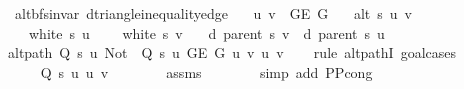 \begin{isabellebody}
\isamarkupfalse%
\ {\isacharparenleft}{\kern0pt}\ alt{\isacharunderscore}{\kern0pt}bfs{\isacharunderscore}{\kern0pt}invar{\isacharparenright}{\kern0pt}\ d{\isacharunderscore}{\kern0pt}triangle{\isacharunderscore}{\kern0pt}inequality{\isacharunderscore}{\kern0pt}edge{\isacharcolon}{\kern0pt}\isanewline
\ \ \ {\isachardoublequoteopen}{\isacharbraceleft}{\kern0pt}u{\isacharcomma}{\kern0pt}\ v{\isacharbraceright}{\kern0pt}\ {\isasymin}\ G{\isachardot}{\kern0pt}E\ G{\isachardoublequoteclose}\isanewline
\ \ \ {\isachardoublequoteopen}alt\ s\ u\ v{\isachardoublequoteclose}\isanewline
\ \ \ {\isachardoublequoteopen}{\isasymnot}\ white\ s\ u{\isachardoublequoteclose}\isanewline
\ \ \ {\isachardoublequoteopen}{\isasymnot}\ white\ s\ v{\isachardoublequoteclose}\isanewline
\ \ \ {\isachardoublequoteopen}d\ {\isacharparenleft}{\kern0pt}parent\ s{\isacharparenright}{\kern0pt}\ v\ {\isasymle}\ d\ {\isacharparenleft}{\kern0pt}parent\ s{\isacharparenright}{\kern0pt}\ u\ {\isacharplus}{\kern0pt}\ {}{\isachardoublequoteclose}\isanewline
%
\isadelimproof
%
\endisadelimproof
%
\isatagproof
{}\isamarkupfalse%
\ {\isacharminus}{\kern0pt}\isanewline
\ \ \isamarkupfalse%
\ {\isachardoublequoteopen}alt{\isacharunderscore}{\kern0pt}path\ {\isacharparenleft}{\kern0pt}Q\ s\ u{\isacharparenright}{\kern0pt}\ {\isacharparenleft}{\kern0pt}Not\ {\isasymcirc}\ Q\ s\ u{\isacharparenright}{\kern0pt}\ {\isacharparenleft}{\kern0pt}G{\isachardot}{\kern0pt}E\ G{\isacharparenright}{\kern0pt}\ {\isacharbrackleft}{\kern0pt}u{\isacharcomma}{\kern0pt}\ v{\isacharbrackright}{\kern0pt}\ u\ v{\isachardoublequoteclose}\isanewline
\ \ \isamarkupfalse%
\ {\isacharparenleft}{\kern0pt}rule\ alt{\isacharunderscore}{\kern0pt}pathI{\isacharcomma}{\kern0pt}\ goal{\isacharunderscore}{\kern0pt}cases{\isacharparenright}{\kern0pt}\isanewline
\ \ \ \ \isamarkupfalse%
\ {}\isanewline
\ \ \ \ \isamarkupfalse%
\ {\isachardoublequoteopen}Q\ s\ u\ {\isacharbraceleft}{\kern0pt}u{\isacharcomma}{\kern0pt}\ v{\isacharbraceright}{\kern0pt}{\isachardoublequoteclose}\isanewline
\ \ \ \ \ \ \isamarkupfalse%
\ assms{\isacharparenleft}{\kern0pt}{}{\isacharparenright}{\kern0pt}\isanewline
\ \ \ \ \ \ \isamarkupfalse%
\ {\isacharparenleft}{\kern0pt}simp\ add{\isacharcolon}{\kern0pt}\ P{\isacharunderscore}{\kern0pt}P{\isacharprime}{\kern0pt}{\isacharprime}{\kern0pt}{\isacharunderscore}{\kern0pt}cong{\isacharparenright}{\kern0pt}\isanewline

\end{isabellebody}
